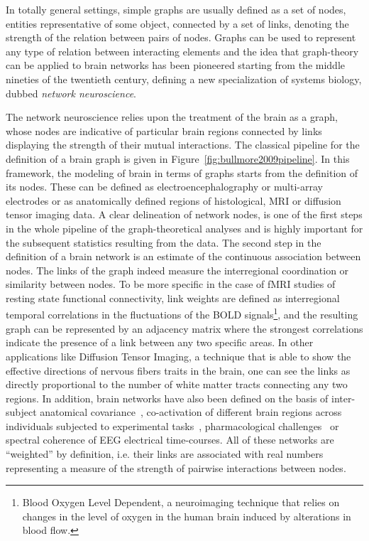 In totally general settings, simple graphs are usually defined as a set of nodes, entities representative of some object, connected by a set of links, denoting the strength of the relation between pairs of nodes.
Graphs can be used to represent any type of relation between interacting elements and the idea that graph-theory can be applied to brain networks has been pioneered starting from the middle nineties of the twentieth century, defining a new specialization of systems biology, dubbed \emph{network neuroscience}.

The network neuroscience relies upon the treatment of the brain as a graph, whose nodes are indicative of particular brain regions connected by links displaying the strength of their mutual interactions. The classical pipeline for the definition of a brain graph is given in Figure~\ref{fig:bullmore2009pipeline}.
In this framework, the modeling of brain in terms of graphs starts from the definition of its nodes. These can be defined as electroencephalography or multi-array electrodes or as anatomically defined regions of histological, MRI or diffusion tensor imaging data.
A clear delineation of network nodes, is one of the first steps in the whole pipeline of the graph-theoretical analyses and is highly important for the subsequent statistics resulting from the data.
The second step in the definition of a brain network is an estimate of the continuous association between nodes. The links of the graph indeed measure the interregional coordination or similarity between nodes.
To be more specific in the case of fMRI studies of resting state functional connectivity, link weights are defined as interregional temporal correlations in the fluctuations of the BOLD signals\footnote{Blood Oxygen Level Dependent, a neuroimaging technique that relies on changes in the level of oxygen in the human brain induced by alterations in blood flow.}, and the resulting graph can be represented by an adjacency matrix where the strongest correlations indicate the presence of a link between any two specific areas.
In other applications like Diffusion Tensor Imaging, a technique that is able to show the effective directions of nervous fibers traits in the brain, one can see the links as directly proportional to the number of white matter tracts connecting any two regions.
In addition, brain networks have also been defined on the basis of inter-subject anatomical covariance~\cite{evans2013,he2007}, co-activation of different brain regions across individuals subjected to experimental tasks~\cite{crossley2013a}, pharmacological challenges~\cite{schwarz2007,schwarz2008} or spectral coherence of EEG electrical time-courses.
All of these networks are ``weighted'' by definition, i.e. their links are associated with real numbers representing a measure of the strength of pairwise interactions between nodes.

